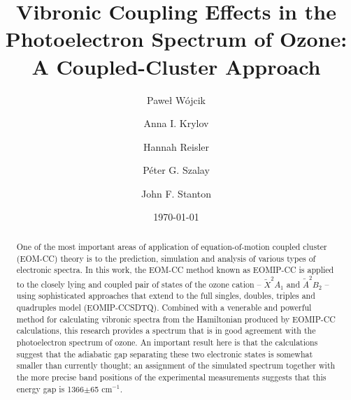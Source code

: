 \documentclass[12pt,pra,aps,superscriptaddress]{revtex4-2}
\begin{document}
\title{Vibronic Coupling Effects in the Photoelectron Spectrum of Ozone: A
Coupled-Cluster Approach}

\author{Pawe{\l} W{\'o}jcik}

\author{Anna I. Krylov}

\author{Hannah Reisler}

\author{P{\'e}ter G. Szalay}

\author{John F. Stanton}

\date{\today}

\begin{abstract}
One of the most important areas of application of equation-of-motion coupled
cluster (EOM-CC) theory is to the prediction, simulation and analysis of
various types of electronic spectra.   In this work, the EOM-CC method known
as EOMIP-CC is applied to the closely lying and coupled pair of states of the
ozone cation -- ${\tilde X}^2A_1$ and ${\tilde A}^2B_2$ -- using sophisticated
approaches that extend to the full singles, doubles, triples and quadruples
model (EOMIP-CCSDTQ).   Combined with a venerable and powerful method for
calculating vibronic spectra from the Hamiltonian produced by EOMIP-CC
calculations, this research provides a spectrum that is in good agreement with
the photoelectron spectrum of ozone.   An important result here is that the
calculations suggest that the adiabatic gap separating these two electronic
states is somewhat smaller than currently thought; an assignment of the
simulated spectrum together with the more precise band positions of the
experimental measurements suggests that this energy gap is 1366$\pm$65
cm$^{-1}$.
\end{abstract}
\end{document}
